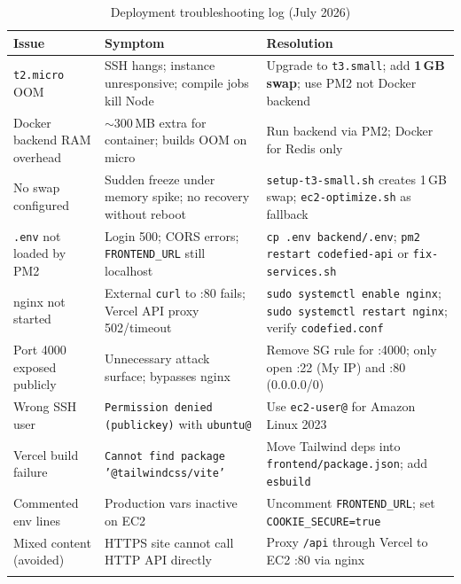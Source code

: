 \documentclass[11pt,a4paper]{article}
\begin{document}
\begin{longtable}{@{}p{3.2cm}p{4.2cm}p{6.8cm}@{}}
\toprule
\textbf{Issue} & \textbf{Symptom} & \textbf{Resolution} \\
\midrule
\endhead
\texttt{t2.micro} OOM &
SSH hangs; instance unresponsive; compile jobs kill Node &
Upgrade to \texttt{t3.small}; add \textbf{1\,GB swap}; use PM2 not Docker backend \\
\addlinespace
Docker backend RAM overhead &
$\sim$300\,MB extra for container; builds OOM on micro &
Run backend via PM2; Docker for Redis only \\
\addlinespace
No swap configured &
Sudden freeze under memory spike; no recovery without reboot &
\texttt{setup-t3-small.sh} creates 1\,GB swap; \texttt{ec2-optimize.sh} as fallback \\
\addlinespace
\texttt{.env} not loaded by PM2 &
Login 500; CORS errors; \texttt{FRONTEND\_URL} still localhost &
\texttt{cp .env backend/.env}; \texttt{pm2 restart codefied-api} or \texttt{fix-services.sh} \\
\addlinespace
nginx not started &
External \texttt{curl} to :80 fails; Vercel API proxy 502/timeout &
\texttt{sudo systemctl enable nginx}; \texttt{sudo systemctl restart nginx}; verify \texttt{codefied.conf} \\
\addlinespace
Port 4000 exposed publicly &
Unnecessary attack surface; bypasses nginx &
Remove SG rule for :4000; only open :22 (My IP) and :80 (0.0.0.0/0) \\
\addlinespace
Wrong SSH user &
\texttt{Permission denied (publickey)} with \texttt{ubuntu@} &
Use \texttt{ec2-user@} for Amazon Linux 2023 \\
\addlinespace
Vercel build failure &
\texttt{Cannot find package '@tailwindcss/vite'} &
Move Tailwind deps into \texttt{frontend/package.json}; add \texttt{esbuild} \\
\addlinespace
Commented env lines &
Production vars inactive on EC2 &
Uncomment \texttt{FRONTEND\_URL}; set \texttt{COOKIE\_SECURE=true} \\
\addlinespace
Mixed content (avoided) &
HTTPS site cannot call HTTP API directly &
Proxy \texttt{/api} through Vercel to EC2 :80 via nginx \\
\bottomrule
\caption{Deployment troubleshooting log (July 2026)}
\end{longtable}
\end{document}
